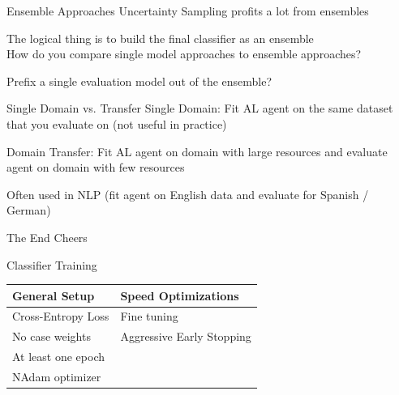 \documentclass[aspectratio=169, 11pt, invertlogo]{ismll-slides}
\begin{document}

\begin{frame}[fragile]{Ensemble Approaches}
	Uncertainty Sampling profits a lot from ensembles
	
	The logical thing is to build the final classifier as an ensemble \\ [7mm]
	How do you compare single model approaches to ensemble approaches?
	
	Prefix a single evaluation model out of the ensemble?
\end{frame}


\begin{frame}[fragile]{Single Domain vs. Transfer}
	Single Domain: Fit AL agent on the same dataset that you evaluate on (not useful in practice)
	
	Domain Transfer: Fit AL agent on domain with large resources and evaluate agent on domain with few resources
	
	Often used in NLP (fit agent on English data and evaluate for Spanish / German)
\end{frame}


\begin{frame}[fragile]{The End}
	Cheers
\end{frame}


\appendix

\begin{frame}[fragile]{Classifier Training}
	\begin{table}
		\centering
		\begin{tabular}{l || l}
			\textbf{General Setup} & \textbf{Speed Optimizations} \\
			\hline
			Cross-Entropy Loss & Fine tuning \\ [1mm]
			No case weights & Aggressive Early Stopping \\[1mm]
			At least one epoch & \\[1mm]
			NAdam optimizer &
		\end{tabular}
	\end{table}
\end{frame}
\end{document}
